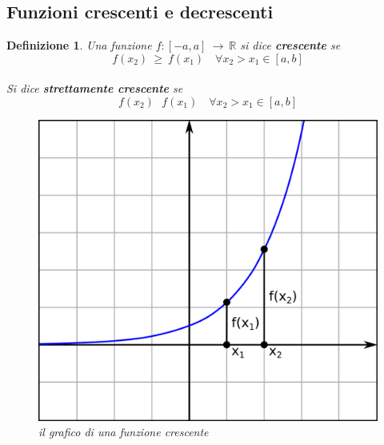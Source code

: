 \documentclass[12pt, a4paper]{article}
\theoremstyle{break}
\newtheorem{defn}{Definizione}
\theoremstyle{lemma}
\theoremstyle{lemma}
\theoremstyle{lemma}
\begin{document}
\subsection{Funzioni crescenti e decrescenti}
\begin{defn}
 Una funzione $f: [-a, a]\ \rightarrow \ \mathbb{R}$ si dice \textbf{crescente} se
 \begin{equation}
   f(x_2)\ \geq \ f(x_1) \quad \forall x_2 > x_1 \in [a,b]
\end{equation}\\
 Si dice \textbf{strettamente crescente} se\\
 \begin{equation}
  f(x_2)\ \>\ f(x_1) \quad \forall x_2 > x_1 \in [a,b]
\end {equation}


\begin{figure}[ht]
  \center
  \includegraphics[scale=0.15]{graficofunzione}
  \caption {il grafico di una funzione crescente}
  \label{fig:grafico_funzione_crescente}
\end{figure}

\end{defn}
\end{document}

